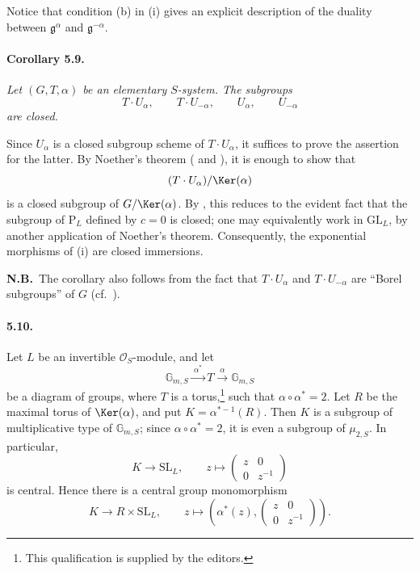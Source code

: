 Notice that condition \textup{(b)} in \textup{(i)} gives an explicit
description of the duality between
\(\mathfrak g^\alpha\) and \(\mathfrak g^{-\alpha}\).

\paragraph{\textbf{Corollary 5.9.}}
\emph{Let \((G,T,\alpha)\) be an elementary \(S\)-system.  The
subgroups}
\[
 T\cdot U_\alpha,\qquad T\cdot U_{-\alpha},
 \qquad U_\alpha,\qquad U_{-\alpha}
\]
\emph{are closed.}

Since \(U_\alpha\) is a closed subgroup scheme of
\(T\cdot U_\alpha\), it suffices to prove the assertion for the
latter.  By Noether's theorem \textup{( and )},
it is enough to show that
\[
 (T\cdot U_\alpha)/\Ker(\alpha)
\]
is a closed subgroup of \(G/\Ker(\alpha)\).  By , this reduces to
the evident fact that the subgroup of \(\mathrm P_L\) defined by
\(c=0\) is closed; one may equivalently work in \(\mathrm{GL}_L\),
by another application of Noether's theorem.  Consequently, the
exponential morphisms of \textup{(i)} are closed
immersions.

\smallskip
\noindent\textbf{N.B.}\ The corollary also follows from the fact that
\(T\cdot U_\alpha\) and \(T\cdot U_{-\alpha}\) are ``Borel
subgroups'' of \(G\) \textup{(cf.\ )}.

\paragraph{\textbf{5.10.}}
Let \(L\) be an invertible \(\mathcal O_S\)-module, and let
\[
 \mathbb G_{m,S}\xrightarrow{\ \alpha^\ast\ }T
 \xrightarrow{\ \alpha\ }\mathbb G_{m,S}
\]
be a diagram of groups, where \(T\) is a torus,\footnote{This
qualification is supplied by the editors.} such that
\(\alpha\circ\alpha^\ast=2\).  Let \(R\) be the maximal torus of
\(\Ker(\alpha)\), and put \(K=\alpha^{\ast-1}(R)\).  Then \(K\) is a
subgroup of multiplicative type of \(\mathbb G_{m,S}\); since
\(\alpha\circ\alpha^\ast=2\), it is even a subgroup of
\(\mu_{2,S}\).  In particular,
\[
 K\longrightarrow\mathrm{SL}_L,
 \qquad
 z\longmapsto\begin{pmatrix}z&0\\0&z^{-1}\end{pmatrix}
\]
is central.  Hence there is a central group monomorphism
\[
 K\longrightarrow R\times\mathrm{SL}_L,
 \qquad
 z\longmapsto
 \left(
 \alpha^\ast(z),
 \begin{pmatrix}z&0\\0&z^{-1}\end{pmatrix}
 \right).
\]

